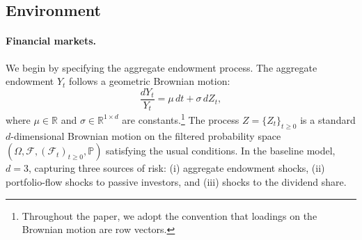 \documentclass[12pt,english]{article}
\begin{document}



\subsection{Environment}

\paragraph{Financial markets.}
We begin by specifying the aggregate endowment process.
The aggregate endowment $Y_t$ follows a geometric Brownian motion:
\begin{equation}\label{eq:agg_endow}
    \frac{dY_t}{Y_t} = \mu\,dt + \sigma\,dZ_t,
\end{equation}
where $\mu \in \mathbb{R}$ and $\sigma \in \mathbb{R}^{1\times d}$ are constants.\footnote{
    Throughout the paper, we adopt the convention that loadings on the Brownian motion are row vectors.
}
The process $Z=\{Z_t\}_{t\ge0}$ is a standard $d$-dimensional Brownian motion on the filtered probability space $(\Omega,\mathcal{F},(\mathcal{F}_t)_{t\ge0},\mathbb{P})$ satisfying the usual conditions.
In the baseline model, $d = 3$, capturing three sources of risk: (i) aggregate endowment shocks, (ii) portfolio-flow shocks to passive investors, and (iii) shocks to the dividend share.
\end{document}
